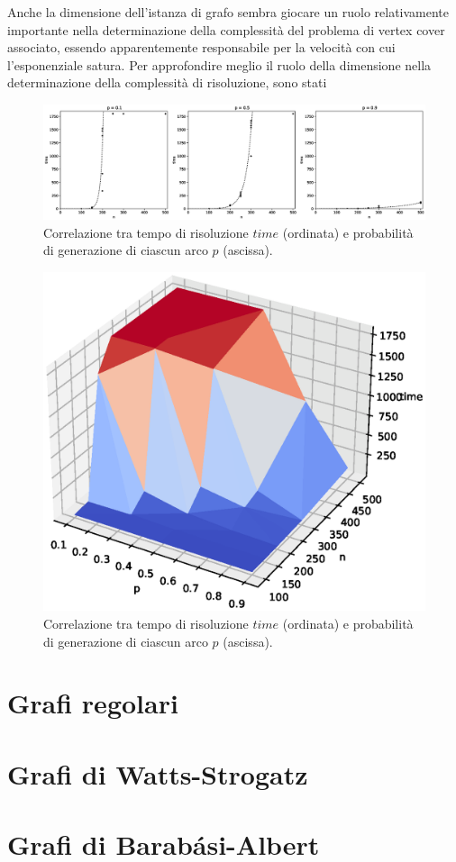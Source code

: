 Anche la dimensione dell'istanza di grafo sembra giocare un ruolo relativamente importante nella determinazione della complessità del problema di vertex cover associato, essendo apparentemente responsabile per la velocità con cui l'esponenziale satura.
Per approfondire meglio il ruolo della dimensione nella determinazione della complessità di risoluzione, sono stati 

\begin{figure}[h!]
     \centering
       \includegraphics[scale=0.4]{images/gnp_p.eps}
       \caption{Correlazione tra tempo di risoluzione $time$ (ordinata) e probabilità di generazione di ciascun arco $p$ (ascissa).}
        \label{fig:gnp2d}
\end{figure}

\begin{figure}[h!]
     \centering
       \includegraphics[scale=0.4]{images/gnp-3d.eps}
       \caption{Correlazione tra tempo di risoluzione $time$ (ordinata) e probabilità di generazione di ciascun arco $p$ (ascissa).}
        \label{fig:gnp2d}
\end{figure}

\section{Grafi regolari}

\section{Grafi di Watts-Strogatz}

\section{Grafi di Barabási-Albert}